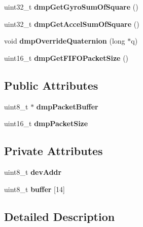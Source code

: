 \begin{DoxyCompactItemize}
\mbox{\label{classMPU6050_a0df6f1422e81759cc8fc90afe2c7c19d}} 
uint32\+\_\+t {\bfseries dmp\+Get\+Gyro\+Sum\+Of\+Square} ()
\item 
\mbox{\label{classMPU6050_ab98f49d9a80425fb27a2bc54ba39ae63}} 
uint32\+\_\+t {\bfseries dmp\+Get\+Accel\+Sum\+Of\+Square} ()
\item 
\mbox{\label{classMPU6050_a7d2adbc6952716186382f33e6987acd1}} 
void {\bfseries dmp\+Override\+Quaternion} (long $\ast$q)
\item 
\mbox{\label{classMPU6050_ac91c7e1c0647a6269b890e04d2fabce9}} 
uint16\+\_\+t {\bfseries dmp\+Get\+F\+I\+F\+O\+Packet\+Size} ()
\end{DoxyCompactItemize}
\subsection*{Public Attributes}
\begin{DoxyCompactItemize}
\item 
\mbox{\label{classMPU6050_aabbe31187ccf2d74a0539b9dc2927e19}} 
uint8\+\_\+t $\ast$ {\bfseries dmp\+Packet\+Buffer}
\item 
\mbox{\label{classMPU6050_a99f1e24e65565db5771435c8f2a2a09c}} 
uint16\+\_\+t {\bfseries dmp\+Packet\+Size}
\end{DoxyCompactItemize}
\subsection*{Private Attributes}
\begin{DoxyCompactItemize}
\item 
\mbox{\label{classMPU6050_ad248bbf6e9da395ab67f7049b50ae474}} 
uint8\+\_\+t {\bfseries dev\+Addr}
\item 
\mbox{\label{classMPU6050_ad2000cad671bb7b293e26f2d463d4cea}} 
uint8\+\_\+t {\bfseries buffer} \mbox{[}14\mbox{]}
\end{DoxyCompactItemize}


\subsection{Detailed Description}


